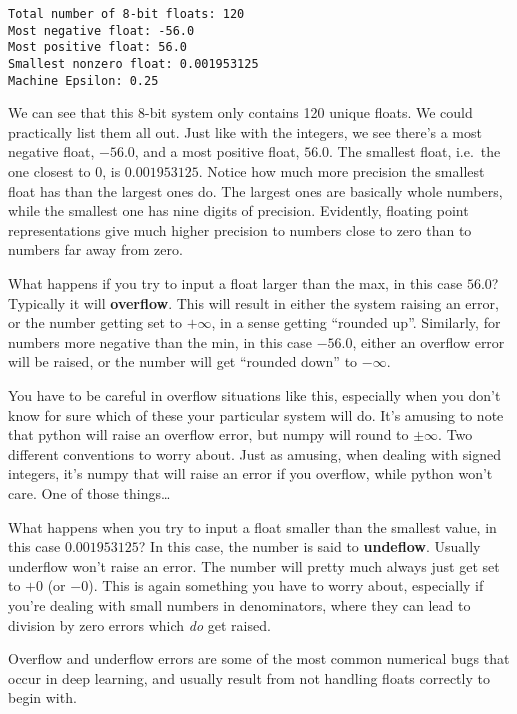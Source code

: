 \documentclass[
  letterpaper,
  DIV=11,
  numbers=noendperiod]{scrreprt}
\begin{document}
\begin{verbatim}
Total number of 8-bit floats: 120
Most negative float: -56.0
Most positive float: 56.0
Smallest nonzero float: 0.001953125
Machine Epsilon: 0.25
\end{verbatim}

We can see that this 8-bit system only contains 120 unique floats. We
could practically list them all out. Just like with the integers, we see
there's a most negative float, \(-56.0\), and a most positive float,
\(56.0\). The smallest float, i.e.~the one closest to \(0\), is
\(0.001953125\). Notice how much more precision the smallest float has
than the largest ones do. The largest ones are basically whole numbers,
while the smallest one has nine digits of precision. Evidently, floating
point representations give much higher precision to numbers close to
zero than to numbers far away from zero.

What happens if you try to input a float larger than the max, in this
case \(56.0\)? Typically it will \textbf{overflow}. This will result in
either the system raising an error, or the number getting set to
\(+\infty\), in a sense getting ``rounded up''. Similarly, for numbers
more negative than the min, in this case \(-56.0\), either an overflow
error will be raised, or the number will get ``rounded down'' to
\(-\infty\).

You have to be careful in overflow situations like this, especially when
you don't know for sure which of these your particular system will do.
It's amusing to note that python will raise an overflow error, but numpy
will round to \(\pm \infty\). Two different conventions to worry about.
Just as amusing, when dealing with signed integers, it's numpy that will
raise an error if you overflow, while python won't care. One of those
things\ldots{}

What happens when you try to input a float smaller than the smallest
value, in this case \(0.001953125\)? In this case, the number is said to
\textbf{undeflow}. Usually underflow won't raise an error. The number
will pretty much always just get set to \(+0\) (or \(-0\)). This is
again something you have to worry about, especially if you're dealing
with small numbers in denominators, where they can lead to division by
zero errors which \emph{do} get raised.

Overflow and underflow errors are some of the most common numerical bugs
that occur in deep learning, and usually result from not handling floats
correctly to begin with.
\end{document}
